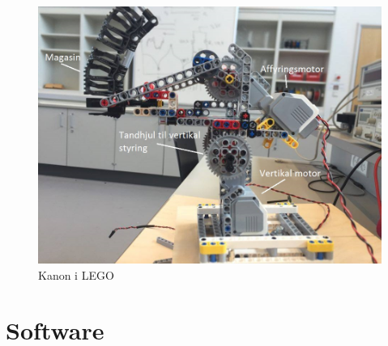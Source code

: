 \begin{figure}[H]
	\centering
	\includegraphics[width=1\textwidth]{Afsnit/DesignOgImplementering/images/kanon}
	\caption{Kanon i LEGO}
	\label{fig:kanon}
\end{figure}
 

\section{Software}

